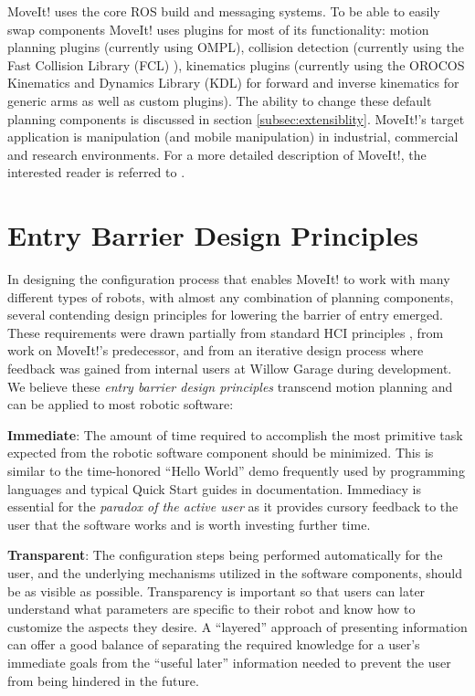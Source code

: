 \documentclass[10pt,journal,compsoc]{joser1}
\begin{document}
{MoveIt! uses the core ROS build and messaging systems. To be able to easily swap components MoveIt! uses plugins for most of its functionality: motion planning plugins (currently using OMPL), collision detection (currently using the Fast Collision Library (FCL) \cite{fcl}), kinematics plugins (currently using  the OROCOS Kinematics and Dynamics Library (KDL) \cite{kdl} for forward and inverse kinematics for generic arms as well as custom plugins). The ability to change these default planning components is discussed in section \ref{subsec:extensiblity}. MoveIt!'s target application is manipulation (and mobile manipulation) in industrial, commercial and research environments. For a more detailed description of MoveIt!, the interested reader is referred to \cite{moveit}.


\section{Entry Barrier Design Principles}
\label{sec::requirements}

In designing the configuration process that enables MoveIt! to work with many different types of robots, with almost any combination of planning components, several contending design principles for lowering the barrier of entry emerged. These requirements were drawn partially from standard HCI principles \cite{galitz2007essential}, from work on MoveIt!'s predecessor, and from an iterative design process where feedback was gained from internal users at Willow Garage during development. We believe these \textit{entry barrier design principles} transcend motion planning and can be applied to most robotic software:

{\bf Immediate}: The amount of time required to accomplish the most primitive task expected from the robotic software component should be minimized. This is similar to the time-honored ``Hello World'' demo frequently used by programming languages and typical Quick Start guides in documentation. Immediacy is essential for the \textit{paradox of the active user} as it provides cursory feedback to the user that the software works and is worth investing further time.

{\bf Transparent}: The configuration steps being performed automatically for the user, and the underlying mechanisms utilized in the software components, should be as visible as possible. Transparency is important so that users can later understand what parameters are specific to their robot and know how to customize the aspects they desire. A ``layered'' approach of presenting information can offer a good balance of separating the required knowledge for a user's immediate goals from the ``useful later'' information needed to prevent the user from being hindered in the future.

}
\end{document}
